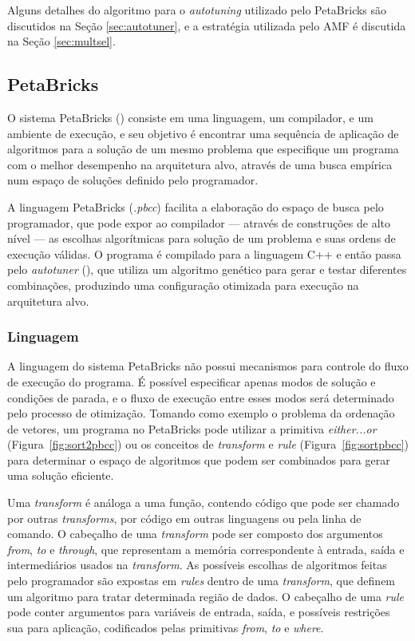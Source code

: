 \documentclass[a4paper, 11pt]{article}
\begin{document}
Alguns detalhes do algoritmo para o \emph{autotuning} utilizado pelo PetaBricks
são discutidos na Seção \ref{sec:autotuner}, e a estratégia utilizada pelo AMF
é discutida na Seção \ref{sec:multsel}.

\subsection{PetaBricks} \label{sec:peta}

O sistema PetaBricks (\citet{ansel2009petabricks, ansel2014phd, 
ansel:xrds:2010, mitcsail-tr:2014})
consiste em uma linguagem, um compilador, e um ambiente de execução,
e seu objetivo é encontrar uma sequência de aplicação de algoritmos 
para a solução de um mesmo problema que especifique um programa com o melhor 
desempenho na arquitetura alvo, através de uma busca empírica num espaço
de soluções definido pelo programador.

A linguagem PetaBricks (\emph{.pbcc}) facilita a 
elaboração do espaço de busca pelo programador, que pode expor ao compilador 
--- através de construções de alto nível --- as escolhas algorítmicas 
para solução de um problema e suas ordens de execução válidas. O programa é 
compilado para a linguagem C++ e então passa pelo \emph{autotuner} 
(\citet{ansel2011efficient}), que utiliza um algoritmo genético para gerar e 
testar diferentes combinações, produzindo uma configuração otimizada para 
execução na arquitetura alvo.

\subsubsection{Linguagem}

A linguagem do sistema PetaBricks não possui mecanismos para controle do fluxo
de execução do programa. É possível especificar apenas modos de solução e 
condições de parada, e o fluxo de execução entre esses modos será determinado 
pelo processo de otimização.
Tomando como exemplo o problema da ordenação de vetores, um programa no
PetaBricks pode utilizar a primitiva \emph{either...or} 
(Figura~\ref{fig:sort2pbcc}) ou os conceitos de \emph{transform} e \emph{rule}
(Figura~\ref{fig:sortpbcc}) para determinar o espaço de algoritmos que podem 
ser combinados para gerar uma solução eficiente.

Uma \emph{transform} é análoga a uma função, contendo código que pode
ser chamado por outras \emph{transforms}, por código em outras linguagens
ou pela linha de comando. O cabeçalho de uma \emph{transform} pode ser composto
dos argumentos \emph{from}, \emph{to} e \emph{through}, que representam a
memória correspondente à entrada, saída e intermediários usados na 
\emph{transform}.
As possíveis escolhas de algoritmos feitas pelo programador são expostas 
em \emph{rules} dentro de uma \emph{transform}, que definem um algoritmo
para tratar determinada região de dados. O cabeçalho de uma \emph{rule} pode
conter argumentos para variáveis de entrada, saída, e possíveis restrições sua 
para aplicação, codificados pelas primitivas \emph{from}, \emph{to} e 
\emph{where}.
\end{document}
